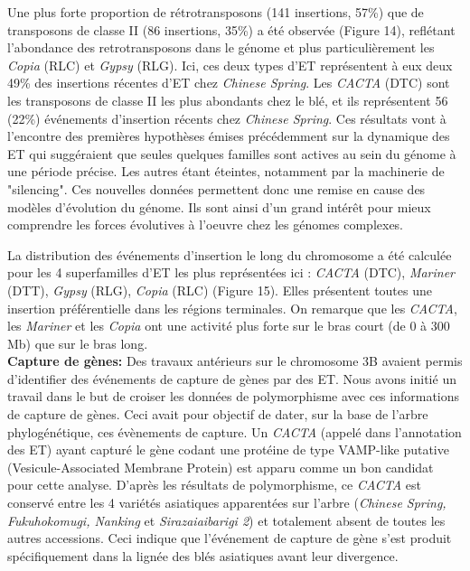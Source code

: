 \documentclass[a4paper, 12pt]{article}
\begin{document}
\begin{onehalfspace}
Une plus forte proportion de rétrotransposons (141 insertions, 57\%) que de transposons de classe II (86 insertions, 35\%) a été observée (Figure 14), reflétant l'abondance des retrotransposons dans le génome et plus particulièrement les \textit{Copia} (RLC) et \textit{Gypsy} (RLG). Ici, ces deux types d'ET représentent à eux deux 49\% des insertions récentes d'ET chez \textit{Chinese Spring}. Les \textit{CACTA} (DTC) sont les transposons de classe II les plus abondants chez le blé, et ils représentent 56 (22\%) événements d'insertion récents chez \textit{Chinese Spring}. Ces résultats vont à l'encontre des premières hypothèses émises précédemment sur la dynamique des ET qui suggéraient que seules quelques familles sont actives au sein du génome à une période précise. Les autres étant éteintes, notamment par la machinerie de "silencing". Ces nouvelles données permettent donc une remise en cause des modèles d'évolution du génome. Ils sont ainsi d'un grand intérêt pour mieux comprendre les forces évolutives à l'oeuvre chez les génomes complexes.

La distribution des événements d'insertion le long du chromosome a été calculée pour les 4 superfamilles d'ET les plus représentées ici : \textit{CACTA} (DTC), \textit{Mariner} (DTT), \textit{Gypsy} (RLG), \textit{Copia} (RLC) (Figure 15). Elles présentent toutes une insertion préférentielle dans les régions terminales. On remarque que les \textit{CACTA}, les \textit{Mariner} et les \textit{Copia} ont une activité plus forte sur le bras court (de 0 à 300 Mb) que sur le bras long.\\

\textbf{Capture de gènes:} Des travaux antérieurs sur le chromosome 3B avaient permis d'identifier des événements de capture de gènes par des ET. Nous avons initié un travail dans le but de croiser les données de polymorphisme avec ces informations de capture de gènes. Ceci avait pour objectif de dater, sur la base de l'arbre phylogénétique, ces évènements de capture. Un \textit{CACTA} (appelé  dans l'annotation des ET) ayant capturé le gène  codant une protéine de type VAMP-like putative (Vesicule-Associated Membrane Protein) est apparu comme un bon candidat pour cette analyse. D'après les résultats de polymorphisme, ce \textit{CACTA} est conservé entre les 4 variétés asiatiques apparentées sur l'arbre (\textit{Chinese Spring, Fukuhokomugi, Nanking } et \textit{Sirazaiaibarigi 2}) et totalement absent de toutes les autres accessions. Ceci indique que l'événement de capture de gène s'est produit spécifiquement dans la lignée des blés asiatiques avant leur divergence.


\end{onehalfspace}
\end{document}
